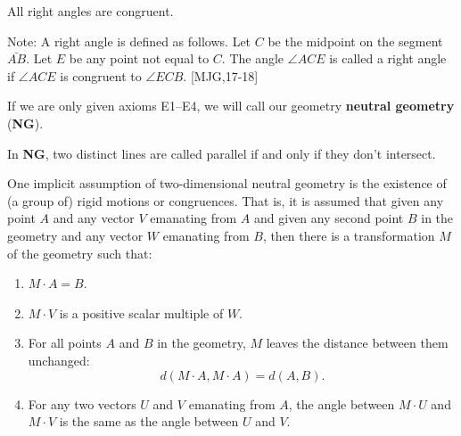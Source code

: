 \documentclass[handout]{ximera}
\begin{document}
\begin{axiom}[E4]
All right angles are congruent.

Note: A right angle is defined as follows. Let $C$ be the midpoint on
the segment $\bar{AB}$. Let $E$ be any point not equal to
$C$. The angle $\angle ACE$ is called a right angle if $\angle ACE$ is
congruent to $\angle ECB$. [MJG,17-18]
\end{axiom}

\begin{definition}
If we are only given axioms E1--E4, we will call our
geometry \textbf{neutral geometry} (\textbf{NG}).
\end{definition}

\begin{definition}
In \textbf{NG}, two distinct lines are called parallel if and only if they
don't intersect.
\end{definition}

One implicit assumption of two-dimensional neutral geometry is the
existence of (a group of) rigid motions or congruences. That is, it is
assumed that given any point $A$ and any vector
$V$ emanating from $A$ and given any second point
$B$ in the geometry and any vector $W$ emanating
from $B$, then there is a transformation $M$ of the
geometry such that:
\begin{enumerate}
\item $M\cdot A=B$.
\item $M\cdot V$ is a positive scalar multiple of $W$.
\item For all points $A$ and $B$ in the geometry,
  $M$ leaves the distance between them unchanged:
\[
d\left(M\cdot A,  M\cdot A\right) =d\left( A,B\right).
\]
\item For any two vectors $U$ and $V$ emanating from
  $A$, the angle between $M\cdot U$ and
  $M\cdot V$ is the same as the angle between $U$
  and $V$.
\end{enumerate}


\end{document}
